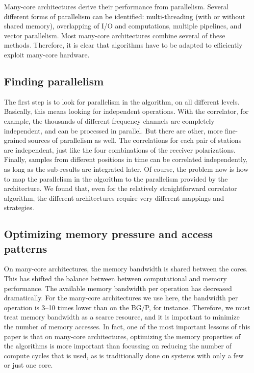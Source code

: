 \documentclass{article}
\begin{document}
Many-core architectures derive their performance from parallelism.
Several different forms of parallelism can be identified:
multi-threading (with or without shared memory), overlapping of I/O
and computations, multiple pipelines, and vector parallelism. Most
many-core architectures combine several of these methods.  Therefore,
it is clear that algorithms have to be adapted to efficiently exploit
many-core hardware.


\subsection{Finding parallelism}

The first step is to look for parallelism in the algorithm, on all
different levels.  Basically, this means looking for independent
operations.  With the correlator, for example, the thousands of
different frequency channels are completely independent, and can be
processed in parallel. But there are other, more fine-grained sources
of parallelism as well.  The correlations for each pair of stations
are independent, just like the four combinations of the receiver
polarizations.  Finally, samples from different positions in time can
be correlated independently, as long as the sub-results are integrated
later. Of course, the problem now is how to map the parallelism in the
algorithm to the parallelism provided by the architecture. We found
that, even for the relatively straightforward correlator algorithm,
the different architectures require very different mappings and
strategies.


\subsection{Optimizing memory pressure and access patterns}

On many-core architectures, the memory bandwidth is shared between the
cores.  This has shifted the balance between between computational and
memory performance.  The available memory bandwidth per operation has
decreased dramatically.  For the many-core architectures we use here,
the bandwidth per operation is 3--10 times lower than on the BG/P, for
instance.  Therefore, we must treat memory bandwidth as a scarce
resource, and it is important to minimize the number of memory
accesses.  In fact, one of the most important lessons of this paper is that on
many-core architectures, optimizing the memory properties of the
algorithms is more important than focussing on reducing the number of
compute cycles that is used, as is traditionally done on systems with
only a few or just one core.
\end{document}
